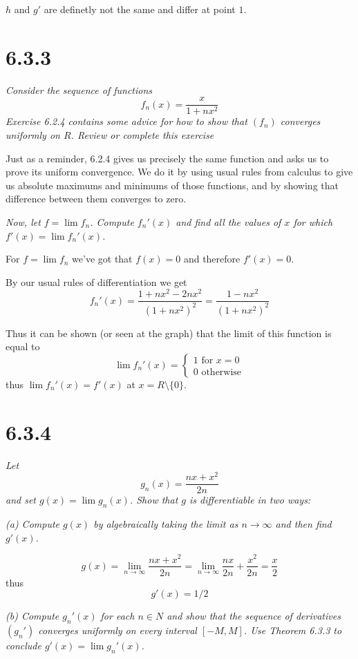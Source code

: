 \documentclass[11pt,oneside,titlepage]{book}
\begin{document}
$h$ and $g'$ are definetly not the same and differ at point $1$.

\section*{6.3.3}
\textit{Consider the sequence of functions}
$$f_n(x) = \frac{x}{1 + nx^2}$$
\textit{Exercise 6.2.4 contains some advice for how to show that $(f_n)$
  converges uniformly on $R$. Review or complete this exercise}

Just as a reminder, 6.2.4 gives us precisely the same function and asks us
to prove its uniform convergence. We do it by using usual rules from calculus
to give us absolute maximums and minimums of those functions, and by showing
that difference between them converges to zero.

\textit{Now, let $f = \lim{f_n}$. Compute $f_n'(x)$ and find all the values
  of $x$ for which $f'(x) = \lim{f_n'(x)}$.}

For $f = \lim f_n$ we've got that $f(x) = 0$ and therefore $f'(x) = 0$.

By our usual rules of differentiation we get 
$$f_n'(x) = \frac{1 + nx^2 - 2nx^2}{(1 + nx^2)^2} =
\frac{1 - nx^2}{(1 + nx^2)^2}$$

Thus it can be shown (or seen at the graph) that the limit of this function
is equal to
$$
\lim{f_n'(x)} =
\begin{cases}
  1 \text{ for } x = 0 \\
  0 \text{ otherwise}
\end{cases}
$$
thus $\lim{f_n'(x)} = f'(x)$ at $x = R \setminus \{0\}$.

\section*{6.3.4}
\textit{Let }
$$g_n(x) = \frac{nx + x^2}{2n}$$
\textit{and set $g(x) = \lim{g_n(x)}$. Show that $g$ is differentiable in two
  ways: }

\textit{(a) Compute $g(x)$ by algebraically taking the limit as $n \to \infty$
  and then find $g'(x)$.}

$$
g(x) = \lim_{n \to \infty}{\frac{nx + x^2}{2n}} =
\lim_{n \to \infty}{\frac{nx}{2n} + \frac{x^2}{2n}} = \frac{x}{2}
$$
thus
$$g'(x) = 1/2$$

\textit{(b) Compute $g_n'(x)$ for each $n \in N$ and show that the sequence
  of derivatives $(g_n')$ converges uniformly on every interval $[-M, M]$.
  Use Theorem 6.3.3 to conclude $g'(x) = \lim{g_n'(x)}$.}
\end{document}
